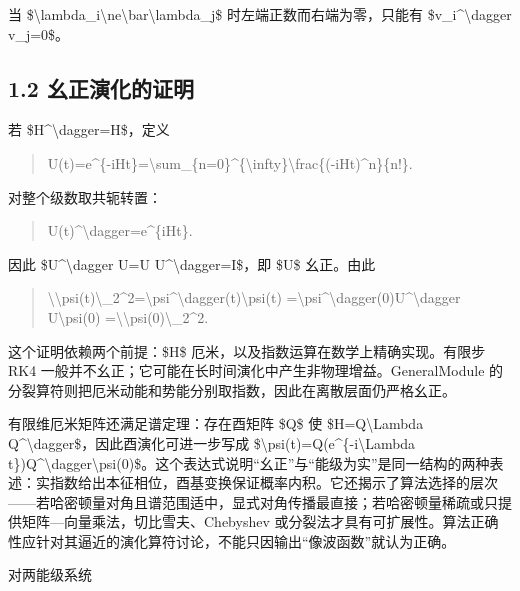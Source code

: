 \documentclass[UTF8,openany,11pt,fontset=fandol]{ctexbook}
\begin{document}
当
\$\textbackslash lambda\_i\textbackslash ne\textbackslash bar\textbackslash lambda\_j\$
时左端正数而右端为零，只能有 \$v\_i\^{}\textbackslash dagger v\_j=0\$。

\subsection{\texorpdfstring{\textbf{1.2
幺正演化的证明}}{1.2 幺正演化的证明}}\label{ux5e7aux6b63ux6f14ux5316ux7684ux8bc1ux660e}

若 \$H\^{}\textbackslash dagger=H\$，定义

\begin{quote}
U(t)=e\^{}\{-iHt\}=\textbackslash sum\_\{n=0\}\^{}\{\textbackslash infty\}\textbackslash frac\{(-iHt)\^{}n\}\{n!\}.
\end{quote}

对整个级数取共轭转置：

\begin{quote}
U(t)\^{}\textbackslash dagger=e\^{}\{iHt\}.
\end{quote}

因此 \$U\^{}\textbackslash dagger U=U U\^{}\textbackslash dagger=I\$，即
\$U\$ 幺正。由此

\begin{quote}
\textbackslash\textbar\textbackslash psi(t)\textbackslash\textbar\_2\^{}2=\textbackslash psi\^{}\textbackslash dagger(t)\textbackslash psi(t)
=\textbackslash psi\^{}\textbackslash dagger(0)U\^{}\textbackslash dagger
U\textbackslash psi(0)
=\textbackslash\textbar\textbackslash psi(0)\textbackslash\textbar\_2\^{}2.
\end{quote}

这个证明依赖两个前提：\$H\$ 厄米，以及指数运算在数学上精确实现。有限步
RK4 一般并不幺正；它可能在长时间演化中产生非物理增益。GeneralModule
的分裂算符则把厄米动能和势能分别取指数，因此在离散层面仍严格幺正。

有限维厄米矩阵还满足谱定理：存在酉矩阵 \$Q\$ 使
\$H=Q\textbackslash Lambda
Q\^{}\textbackslash dagger\$，因此酉演化可进一步写成
\$\textbackslash psi(t)=Q(e\^{}\{-i\textbackslash Lambda
t\})Q\^{}\textbackslash dagger\textbackslash psi(0)\$。这个表达式说明``幺正''与``能级为实''是同一结构的两种表述：实指数给出本征相位，酉基变换保证概率内积。它还揭示了算法选择的层次------若哈密顿量对角且谱范围适中，显式对角传播最直接；若哈密顿量稀疏或只提供矩阵---向量乘法，切比雪夫、Chebyshev
或分裂法才具有可扩展性。算法正确性应针对其逼近的演化算符讨论，不能只因输出``像波函数''就认为正确。

对两能级系统
\end{document}
